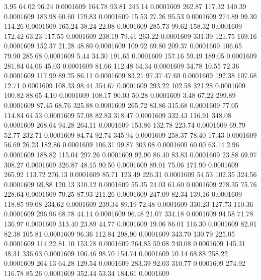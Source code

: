    3.95   64.02   96.24   0.0001609
 164.78   93.81  243.14   0.0001609
 262.87  117.32  140.39   0.0001609
 183.98   60.60  179.83   0.0001609
  15.53   27.26   95.53   0.0001609
 274.89   99.30  114.26   0.0001609
 165.24   38.24   22.08   0.0001609
 285.73   99.62  158.32   0.0001609
 172.42   63.23  117.55   0.0001609
 238.19   79.41  263.22   0.0001609
 331.39  121.75  169.16   0.0001609
 152.37   21.28   48.80   0.0001609
 109.92   69.80  209.37   0.0001609
 106.65   79.90  285.68   0.0001609
   5.44   34.30  191.65   0.0001609
 157.16   59.49  189.05   0.0001609
 281.84   64.06   45.03   0.0001609
  81.66  112.48   64.34   0.0001609
  34.78   10.55   72.36   0.0001609
 117.99   89.25   86.11   0.0001609
  83.21   97.37   47.69   0.0001609
 192.38  107.68   12.71   0.0001609
 108.33   98.44  354.67   0.0001609
 293.22  102.58  321.28   0.0001609
 100.82   88.65    4.10   0.0001609
 108.17   90.03   50.28   0.0001609
   3.48   67.22  299.89   0.0001609
  87.45   68.76  325.88   0.0001609
 265.72   83.86  315.68   0.0001609
  77.05  114.84   64.53   0.0001609
  57.08   82.83  318.47   0.0001609
 332.43  116.91  348.08   0.0001609
 268.64   94.28  264.11   0.0001609
 153.86  132.78  223.74   0.0001609
  69.79   52.77  232.71   0.0001609
  84.74   92.74  345.94   0.0001609
 258.37   78.40   17.43   0.0001609
  56.69   26.23  182.86   0.0001609
 106.31   99.87  303.08   0.0001609
  60.00   63.14    2.96   0.0001609
 188.82  115.04  297.26   0.0001609
  92.90   86.40   83.83   0.0001609
  23.88   69.97  308.27   0.0001609
 326.87   48.15   90.50   0.0001609
  89.01   75.06  171.90   0.0001609
 265.92  113.72  276.13   0.0001609
  85.71  123.49  226.31   0.0001609
  54.53  102.35  324.56   0.0001609
  69.88  120.13  310.12   0.0001609
  55.35   24.03   61.60   0.0001609
 278.35   75.76  228.64   0.0001609
  70.25   87.93  211.26   0.0001609
 247.09   82.34  139.16   0.0001609
 118.85   99.08  234.62   0.0001609
 239.34   89.19   72.48   0.0001609
 330.23  127.73  110.36   0.0001609
 296.96   68.78   44.14   0.0001609
  96.48   21.07  334.18   0.0001609
  94.58   71.78  136.97   0.0001609
 313.40   23.89   44.77   0.0001609
  19.06   86.01  116.30   0.0001609
  82.01   82.38  105.81   0.0001609
  96.36  112.84  298.90   0.0001609
 343.70  130.79  225.05   0.0001609
 114.22   81.10  153.78   0.0001609
 264.85   59.08  240.08   0.0001609
 145.31   48.31  336.63   0.0001609
 106.46   98.70  154.74   0.0001609
  70.14   68.88  258.22   0.0001609
 264.13   64.28  129.54   0.0001609
 283.39   92.03  310.77   0.0001609
 274.92  116.78   85.26   0.0001609
 352.44   53.34  184.61   0.0001609

